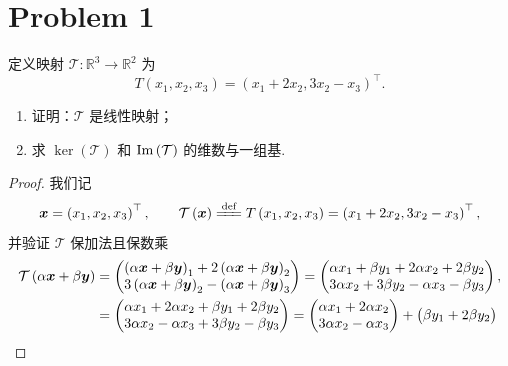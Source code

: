 \section*{Problem 1}

定义映射 $\mathcal{T}: \mathbb{R}^3 \to \mathbb{R}^2$ 为
\[
T \left(x_1, x_2, x_3\right) = \left(x_1 + 2x_2, 3x_2 - x_3\right)^\top.
\]
\begin{enumerate}
    \item 证明：$\mathcal{T}$ 是线性映射；
    \item 求 $\ker \left(\mathcal{T}\right)$ 和 $\mathrm{Im} \left(\mathcal{T}\right)$ 的维数与一组基.
\end{enumerate}

\begin{proof}
我们记
\[
\bvec{x}=\left(x_1,x_2,x_3\right)^\top,\qquad
\mathcal{T} \left(\bvec{x}\right) \xlongequal{\textrm{def}} T \left(x_1, x_2, x_3\right) = \left(x_1 + 2x_2, 3x_2 - x_3\right)^\top,
\]
并验证 $\mathcal{T}$ 保加法且保数乘
\[
\begin{aligned}
    \mathcal{T} \left(\alpha \boldsymbol{x} + \beta \boldsymbol{y}\right) &= \begin{pmatrix}
        \left(\alpha \boldsymbol{x} + \beta \boldsymbol{y}\right)_1 + 2 \left(\alpha \boldsymbol{x} + \beta \boldsymbol{y}\right)_2 \\
        3\left(\alpha \boldsymbol{x} + \beta \boldsymbol{y}\right)_2 - \left(\alpha \boldsymbol{x} + \beta \boldsymbol{y}\right)_3
    \end{pmatrix} = \begin{pmatrix}
        \alpha x_1 + \beta y_1 + 2 \alpha x_2 + 2 \beta y_2 \\
        3 \alpha x_2 + 3 \beta y_2 - \alpha x_3 - \beta y_3 \\
    \end{pmatrix}, \\
    &= \begin{pmatrix}
        \alpha x_1 + 2 \alpha x_2 + \beta y_1 + 2 \beta y_2 \\
        3 \alpha x_2 - \alpha x_3 + 3 \beta y_2 - \beta y_3 \\
    \end{pmatrix} = \begin{pmatrix}
        \alpha x_1 + 2 \alpha x_2 \\
        3 \alpha x_2 - \alpha x_3 \\
    \end{pmatrix} + \begin{pmatrix}
        \beta y_1 + 2 \beta y_2 \\

\end{pmatrix}
\end{aligned}\]
\end{proof}
